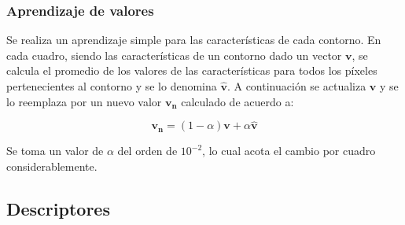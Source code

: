 \subsubsection{Aprendizaje de valores}

Se realiza un aprendizaje simple para las características de cada contorno. En
cada cuadro, siendo las características de un contorno dado un vector
$\mathbf{v}$, se calcula el promedio de los valores de las características para
todos los píxeles pertenecientes al contorno y se lo denomina
$\hat{\mathbf{v}}$. A continuación se actualiza $\mathbf{v}$ y se lo reemplaza
por un nuevo valor $\mathbf{v_n}$ calculado de acuerdo a:

\[
  \mathbf{v_n} = \left(1-\alpha\right)\mathbf{v} + \alpha \hat{\mathbf{v}}
\]

Se toma un valor de $\alpha$ del orden de $10^{-2}$, lo cual acota el cambio por
cuadro considerablemente. %

\subsection{Descriptores}
